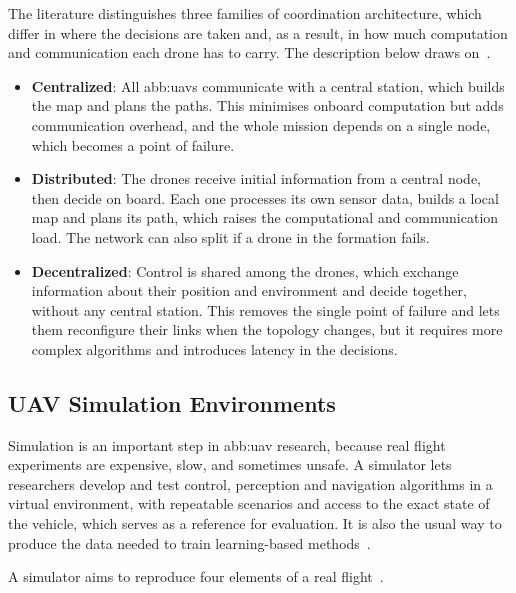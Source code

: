 The literature distinguishes three families of coordination architecture, which
differ in where the decisions are taken and, as a result, in how much computation
and communication each drone has to carry. The description below draws
on~\cite{kumar2025comprehensive, chandran2024network}.

\begin{itemize}[itemsep=0.5em]
    \item \textbf{Centralized}: All \glspl{abb:uav} communicate with a central
          station, which builds the map and plans the paths. This minimises
          onboard computation but adds communication overhead, and the whole
          mission depends on a single node, which becomes a point of failure.
    \item \textbf{Distributed}: The drones receive initial information from a
          central node, then decide on board. Each one processes its own sensor
          data, builds a local map and plans its path, which raises the
          computational and communication load. The network can also split if a
          drone in the formation fails.
    \item \textbf{Decentralized}: Control is shared among the drones, which
          exchange information about their position and environment and decide
          together, without any central station. This removes the single point of
          failure and lets them reconfigure their links when the topology
          changes, but it requires more complex algorithms and introduces latency
          in the decisions.
\end{itemize}
\subsection{UAV Simulation Environments}%
\label{subsec:bg:uav-simulation}

Simulation is an important step in \gls{abb:uav} research, because real flight
experiments are expensive, slow, and sometimes unsafe. A simulator lets
researchers develop and test control, perception and navigation algorithms in a
virtual environment, with repeatable scenarios and access to the exact state of
the vehicle, which serves as a reference for evaluation. It is also the usual way
to produce the data needed to train learning-based
methods~\cite{jacinto2024pegasus}.

A simulator aims to reproduce four elements of a real
flight~\cite{jacinto2024pegasus, tejeroruiz2024realistic}.

